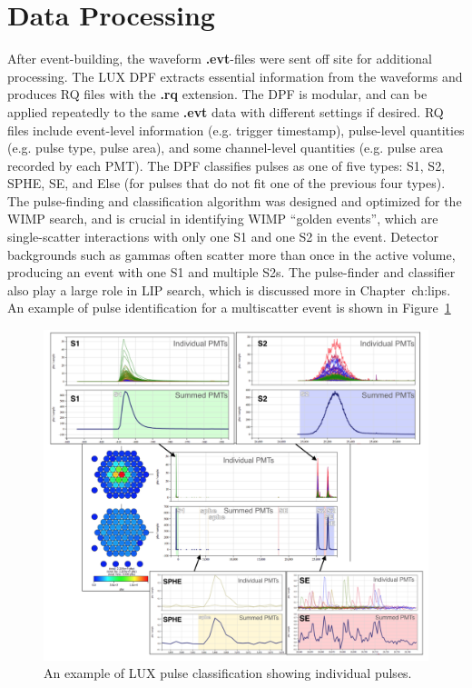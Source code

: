 \section{Data Processing}
After event-building, the waveform \textbf{.evt}-files were sent off site for additional processing. The \ac{LUX} \ac{DPF} extracts essential information from the waveforms and produces \ac{RQ} files with the \textbf{.rq} extension. The \ac{DPF} is modular, and can be applied repeatedly to the same \textbf{.evt} data with different settings if desired. \ac{RQ} files include event-level information (e.g. trigger timestamp), pulse-level quantities (e.g. pulse type, pulse area), and some channel-level quantities (e.g. pulse area recorded by each \ac{PMT}). The \ac{DPF} classifies pulses as one of five types: S1, S2, \ac{SPHE}, \ac{SE}, and Else (for pulses that do not fit one of the previous four types). The pulse-finding and classification algorithm was designed and optimized for the \ac{WIMP} search, and is crucial in identifying \ac{WIMP} ``golden events'', which are single-scatter interactions with only one S1 and one S2 in the event. Detector backgrounds such as gammas often scatter more than once in the active volume, producing an event with one S1 and multiple S2s. The pulse-finder and classifier also play a large role in \ac{LIP} search, which is discussed more in Chapter~{ch:lips}. An example of pulse identification for a multiscatter event is shown in Figure~\ref{fig:lux_pulses}

\begin{figure}[htbp]
\begin{center}
\includegraphics[width=\textwidth]{figures/lux/lux_pulses.png}
\caption{An example of \ac{LUX} pulse classification showing individual pulses. }
\label{fig:lux_pulses}
\end{center}
\end{figure}


